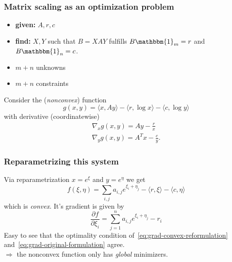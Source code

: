 \documentclass{beamer}
\begin{document}
\begin{frame}
  \frametitle{Matrix scaling as an optimization problem}
  \begin{itemize}
    \item \textbf{given:} $A, r, c$
    \item \textbf{find:} $X, Y$ such that $B=XAY$ fulfills $B\mathbbm{1}_m=r$ and $B \mathbbm{1}_n=c$.
    \item $m+n$ unknowns
          \item $m+n$ constraints
  \end{itemize}
  Consider the (\emph{nonconvex}) function
  \begin{equation}
    g(x,y) = \langle x, A y \rangle - \langle r, \log x \rangle - \langle c, \log y \rangle
  \end{equation}
  with derivative (coordinatewise)
  \begin{equation}
    \label{eq:grad-original-formulation}
    \begin{aligned}
      \nabla_x g(x,y) = Ay - \frac{r}{x} \\
      \nabla_y g(x,y) = A^T x - \frac{c}{y}.
    \end{aligned}
  \end{equation}
\end{frame}


\begin{frame}
  \frametitle{Reparametrizing this system}
  Via reparametrization $x= e^\xi$ and $y=e^{\eta}$ we get
  \begin{equation}
    f(\xi, \eta) = \sum_{i,j} a_{i,j} e^{\xi_i + \eta_j} - \langle r, \xi \rangle - \langle c, \eta \rangle
  \end{equation}
  which is \emph{convex}. It's gradient is given by
  \begin{equation}
    \label{eq:grad-convex-reformulation}
    \frac{\partial f}{\partial \xi_i} = \sum_{j=1}^{n} a_{i,j} e^{\xi_i + \eta_j} - r_i
  \end{equation}
  Easy to see that the optimality condition of~\eqref{eq:grad-convex-reformulation} and~\eqref{eq:grad-original-formulation} agree.\\
  $\Rightarrow$ the nonconvex function only has \emph{global} minimizers.
\end{frame}
\end{document}
